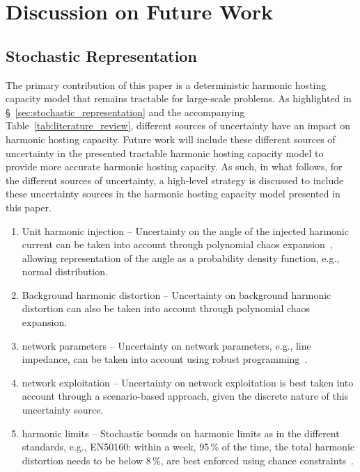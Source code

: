 \section{Discussion on Future Work}
\label{sec:future_work}

\subsection{Stochastic Representation}

The primary contribution of this paper is a deterministic harmonic hosting capacity model that remains tractable for large-scale problems. As highlighted in \S~\ref{sec:stochastic_representation} and the accompanying Table~\ref{tab:literature_review}, different sources of uncertainty have an impact on harmonic hosting capacity. Future work will include these different sources of uncertainty in the presented tractable harmonic hosting capacity model to provide more accurate harmonic hosting capacity. As such, in what follows, for the different sources of uncertainty, a high-level strategy is discussed to include these uncertainty sources in the harmonic hosting capacity model presented in this paper.
\begin{enumerate}
    \item [a)] Unit harmonic injection -- Uncertainty on the angle of the injected harmonic current can be taken into account through polynomial chaos expansion~\cite{sullivan_introduction_2015}, allowing representation of the angle as a probability density function, e.g., normal distribution.
    \item [b)] Background harmonic distortion -- Uncertainty on background harmonic distortion can also be taken into account through polynomial chaos expansion.
    \item [c)] network parameters -- Uncertainty on network parameters, e.g., line impedance, can be taken into account using robust programming~\cite{ben-tal_robust_2009}.
    \item [d)] network exploitation -- Uncertainty on network exploitation is best taken into account through a scenario-based approach, given the discrete nature of this uncertainty source.
    \item [e)] harmonic limits -- Stochastic bounds on harmonic limits as in the different standards, e.g., EN50160: within a week, 95\,\% of the time, the total harmonic distortion needs to be below 8\,\%, are best enforced using chance constraints~\cite{birge_introduction_2011}.
\end{enumerate}

